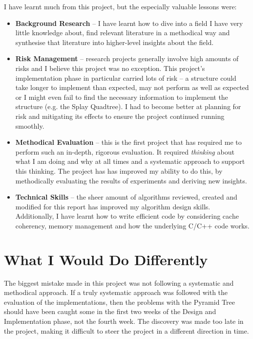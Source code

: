 I have learnt much from this project, but the especially valuable lessons were:
\begin{itemize}
	\item \textbf{Background Research} -- I have learnt how to dive into a field I have very little knowledge about, find relevant literature in a methodical way and synthesise that literature into higher-level insights about the field.
	\item \textbf{Risk Management} -- research projects generally involve high amounts of risks and I believe this project was no exception. This project's implementation phase in particular carried lots of risk -- a structure could take longer to implement than expected, may not perform as well as expected or I might even fail to find the necessary information to implement the structure (e.g. the Splay Quadtree). I had to become better at planning for risk and mitigating its effects to ensure the project continued running smoothly.
	\item \textbf{Methodical Evaluation} -- this is the first project that has required me to perform such an in-depth, rigorous evaluation. It required \textit{thinking} about what I am doing and why at all times and a systematic approach to support this thinking. The project has has improved my ability to do this, by methodically evaluating the results of experiments and deriving new insights.
	\item \textbf{Technical Skills} -- the sheer amount of algorithms reviewed, created and modified for this report has improved my algorithm design skills. Additionally, I have learnt how to write efficient code by considering cache coherency, memory management and how the underlying C/C++ code works.
\end{itemize}

\section{What I Would Do Differently}

The biggest mistake made in this project was not following a systematic and methodical approach. If a truly systematic approach was followed with the evaluation of the implementations, then the problems with the Pyramid Tree should have been caught some in the first two weeks of the Design and Implementation phase, not the fourth week. The discovery was made too late in the project, making it difficult to steer the project in a different direction in time.

